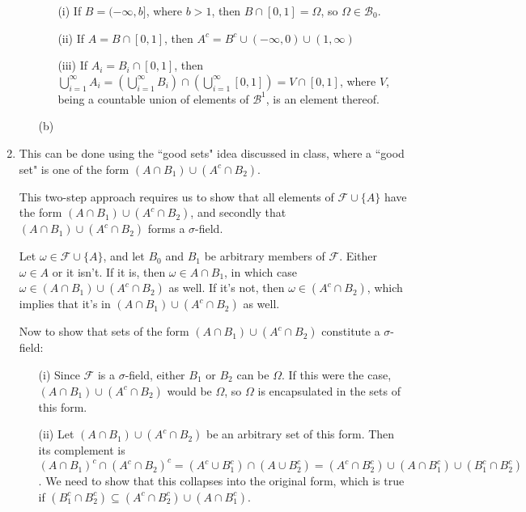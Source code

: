 \documentclass[12pt]{article}
\begin{document}
\begin{enumerate}
\begin{itemize}
\begin{itemize}
\item[(i)] If $B=(-\infty,b]$, where $b>1$, then $B \cap [0,1] = \Omega$, so $\Omega \in \mathcal{B}_0$.

\item[(ii)] If $A=B \cap [0,1]$, then $A^c=B^c \cup (-\infty,0) \cup (1,\infty)$

\item[(iii)] If $A_i=B_i\cap[0,1]$, then $\bigcup^\infty_{i=1}A_i= \left( \bigcup^\infty_{i=1} B_i \right)\cap \left( \bigcup^\infty_{i=1} [0,1] \right) = V \cap [0,1]$, where $V$, being a countable union of elements of $\mathcal{B}^1$, is an element thereof.

\end{itemize}

\item[(b)]

\end{itemize}

\item This can be done using the ``good sets" idea discussed in class, where a ``good set" is one of the form $(A \cap B_1)\cup(A^c \cap B_2)$. 

This two-step approach requires us to show that all elements of $\mathcal{F} \cup \{A\}$ have the form $(A \cap B_1)\cup(A^c \cap B_2)$, and secondly that $(A \cap B_1)\cup(A^c \cap B_2)$ forms a $\sigma$-field.

Let $\omega \in \mathcal{F} \cup \{A\}$, and let $B_0$ and $B_1$ be arbitrary members of $\mathcal{F}$. Either $\omega \in A$ or it isn't. If it is, then $\omega \in A\cap B_1$, in which case $\omega \in (A \cap B_1)\cup(A^c \cap B_2)$ as well. If it's not, then $\omega \in (A^c \cap B_2)$, which implies that it's in $(A \cap B_1)\cup(A^c \cap B_2)$ as well.

Now to show that sets of the form $(A \cap B_1)\cup(A^c \cap B_2)$ constitute a $\sigma$-field:

\begin{itemize}
\item[(i)] Since $\mathcal{F}$ is a $\sigma$-field, either $B_1$ or $B_2$ can be $\Omega$. If this were the case, $(A \cap B_1)\cup(A^c \cap B_2)$ would be $\Omega$, so $\Omega$ is encapsulated in the sets of this form.

\item[(ii)] Let $(A \cap B_1)\cup(A^c \cap B_2)$
 be an arbitrary set of this form. Then its complement is $(A \cap B_1)^c \cap (A^c \cap B_2)^c = (A^c \cup B_1^c) \cap (A \cup B_2^c)=(A^c \cap B_2^c) \cup (A \cap B_1^c) \cup (B_1^c \cap B_2^c)$. We need to show that this collapses into the original form, which is true if $(B_1^c \cap B_2^c) \subseteq (A^c \cap B_2^c) \cup (A \cap B_1^c)$.
 

\end{itemize}
\end{enumerate}
\end{document}
